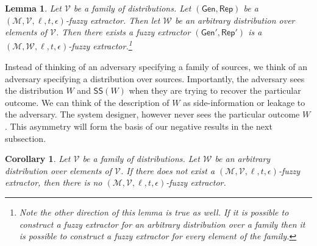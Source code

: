 \documentclass[11pt]{article}
\newcommand{\class}[1]{{\ensuremath{\mathsf{#1}}}}
\newcommand{\gen}{\ensuremath{\class{Gen}}\xspace}
\newcommand{\rep}{\ensuremath{\class{Rep}}\xspace}
\newcommand{\sketch}{\ensuremath{\class{SS}}\xspace}
\newcommand{\rec}{\ensuremath{\class{Rec}}\xspace}
\newtheorem{lemma}[theorem]{Lemma}
\newtheorem{corollary}[theorem]{Corollary}
\begin{document}
\begin{lemma}
\label{lem:quant switch fuzz}
Let $\mathcal{V}$ be a family of distributions.  Let $(\gen, \rep)$ be a $(\mathcal{M}, \mathcal{V}, \ell, t, \epsilon)$-fuzzy extractor.  Then let $\mathcal{W}$ be an arbitrary distribution over elements of $\mathcal{V}$.  Then there exists a fuzzy extractor $(\gen', \rep')$ is a $(\mathcal{M}, \mathcal{W}, \ell, t, \epsilon)$-fuzzy extractor.\footnote{Note the other direction of this lemma is true as well.  If it is possible to construct a fuzzy extractor for an arbitrary distribution over a family then it is possible to construct a fuzzy extractor for every element of the family.}
\end{lemma}

Instead of thinking of an adversary specifying a family of sources, we think of an adversary specifying a distribution over sources.  Importantly, the adversary sees the distribution $W$ and $\sketch(W)$ when they are trying to recover the particular outcome.  We can think of the description of $W$ as side-information or leakage to the adversary.  The system designer, however never sees the particular outcome $W$.  This asymmetry will form the basis of our negative results in the next subsection.

\begin{corollary}
\label{cor:no fuzz for dist}
Let $\mathcal{V}$ be a family of distributions.  Let $\mathcal{W}$ be an arbitrary distribution over elements of $\mathcal{V}$.  If there does not exist a $(\mathcal{M}, \mathcal{V}, \ell, t, \epsilon)$-fuzzy extractor, then there is no $(\mathcal{M}, \mathcal{V}, \ell, t, \epsilon)$-fuzzy extractor.
\end{corollary}

\end{document}
